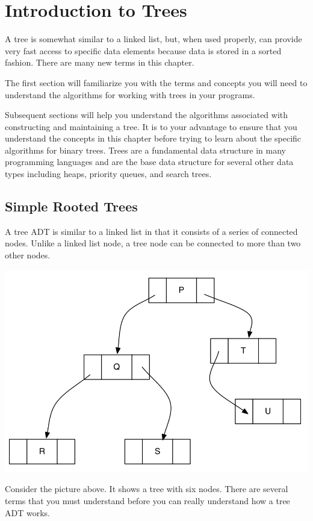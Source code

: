 \chapter {Introduction to Trees}
 A tree is somewhat
similar to a linked list, but, when used properly, can provide very fast
access to specific data elements because data is stored in a sorted
fashion. There are many new terms in this chapter. 

The first section  will familiarize you with the terms and
concepts you will need to understand the algorithms for working with
trees in your programs.

Subsequent sections will help you understand the algorithms
associated with constructing and maintaining a  tree.   It is to your advantage to ensure that you understand the concepts in this chapter before trying to learn about the specific algorithms for binary trees.   Trees are a fundamental data structure in many programming languages and are the base data structure for several other data types including heaps, priority queues,  and search trees.

\section {Simple Rooted Trees}

A tree ADT is similar to a linked list in that it consists of a series
of connected nodes. Unlike a linked list node, a tree node can be
connected to more than two other nodes.

\includegraphics[width=5.80556in]{pictures/image1.png}

Consider the picture above. It shows a tree with six nodes. There are
several terms that you must understand before you can really understand
how a tree ADT works.

